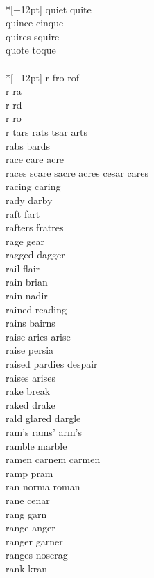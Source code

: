 \vspace{14pt}
\noindent\notextbf{\LargeQ}\\*[+12pt]
quiet quite\\
quince cinque\\
quires squire\\
quote toque\\

\vspace{14pt}
\noindent\notextbf{\LargeR}\\*[+12pt]
r fro rof  \\
r ra \\
r rd \\
r ro \\
r tars rats tsar arts   \\
rabs bards \\
race care acre\\
races scare sacre acres cesar cares\\
racing caring\\
rady darby \\
raft fart\\
rafters fratres\\
rage gear\\
ragged dagger\\
rail flair \\
rain brian \\
rain nadir \\
rained reading \\
rains bairns \\
raise aries arise\\
raise persia \\
raised pardies despair \\
raises arises\\
rake break \\
raked drake\\
rald glared dargle  \\
ram's rams' arm's\\
ramble marble\\
ramen carnem carmen \\
ramp pram\\
ran norma roman  \\
rane cenar \\
rang garn\\
range anger\\
ranger garner\\
ranges noserag \\
rank kran\\
